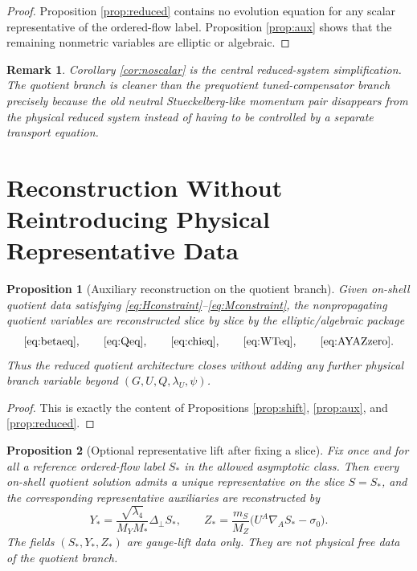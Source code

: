 \documentclass[11pt]{article}
\newtheorem{proposition}{Proposition}
\newtheorem{remark}{Remark}
\begin{document}
\begin{proof}
Proposition \ref{prop:reduced} contains no evolution equation for any scalar representative of the ordered-flow label. Proposition \ref{prop:aux} shows that the remaining nonmetric variables are elliptic or algebraic.
\end{proof}

\begin{remark}
Corollary \ref{cor:noscalar} is the central reduced-system simplification. The quotient branch is cleaner than the prequotient tuned-compensator branch precisely because the old neutral Stueckelberg-like momentum pair disappears from the physical reduced system instead of having to be controlled by a separate transport equation.
\end{remark}

\section{Reconstruction Without Reintroducing Physical Representative Data}

\begin{proposition}[Auxiliary reconstruction on the quotient branch]
\label{prop:auxrecon}
Given on-shell quotient data satisfying \eqref{eq:Hconstraint}--\eqref{eq:Mconstraint}, the nonpropagating quotient variables are reconstructed slice by slice by the elliptic/algebraic package
\[
\eqref{eq:betaeq},
\qquad
\eqref{eq:Qeq},
\qquad
\eqref{eq:chieq},
\qquad
\eqref{eq:WTeq},
\qquad
\eqref{eq:AYAZzero}.
\]
Thus the reduced quotient architecture closes without adding any further physical branch variable beyond \((G,U,Q,\lambda_U,\psi)\).
\end{proposition}

\begin{proof}
This is exactly the content of Propositions \ref{prop:shift}, \ref{prop:aux}, and \ref{prop:reduced}.
\end{proof}

\begin{proposition}[Optional representative lift after fixing a slice]
\label{prop:lift}
Fix once and for all a reference ordered-flow label \(S_*\) in the allowed asymptotic class. Then every on-shell quotient solution admits a unique representative on the slice \(S=S_*\), and the corresponding representative auxiliaries are reconstructed by
\begin{equation}
Y_*
=
\frac{\sqrt{\lambda_4}}{M_YM_*}\Delta_\perp S_*,
\qquad
Z_*
=
\frac{m_S}{M_Z}\bigl(U^A\nabla_A S_*-\sigma_0\bigr).
\label{eq:lift}
\end{equation}
The fields \((S_*,Y_*,Z_*)\) are gauge-lift data only. They are not physical free data of the quotient branch.
\end{proposition}
\end{document}
